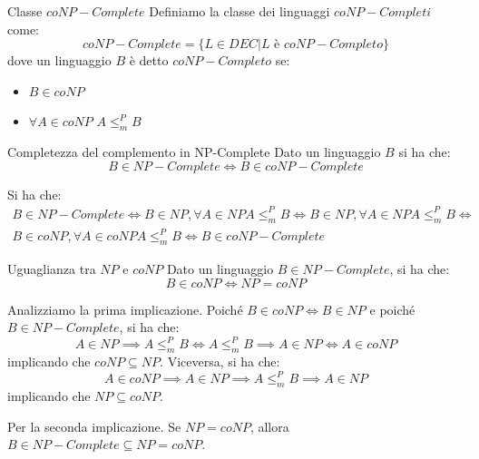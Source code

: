 \begin{Definition}{Classe $coNP-Complete$}{}
Definiamo la classe dei linguaggi $coNP-Completi$ come:
\begin{equation*}
    coNP-Complete = \{L\in DEC | L\textit{ è }coNP-Completo\}
\end{equation*}
dove un linguaggio $B$ è detto $coNP-Completo$ se:
\begin{itemize}
    \item $B\in coNP$
    \item $\forall A\in coNP$ $A\leq^P_mB$
\end{itemize}
\end{Definition}

\begin{Thm}{Completezza del complemento in NP-Complete}{}\label{thm:completezza-com-np-complete}
Dato un linguaggio $B$ si ha che:
\begin{equation*}
    B\in NP-Complete\iff B\in coNP-Complete    
\end{equation*}
\begin{demonstration}
Si ha che:
\begin{align*}
    B\in NP-Complete\iff B\in NP, \forall A\in NP A\leq^P_m B\iff B\in NP, \forall A\in NP A\leq^P_m B\iff\\ B\in coNP, \forall A\in coNP A\leq^P_m B\iff B\in coNP-Complete
\end{align*}    
\end{demonstration}
\end{Thm}

\begin{Thm}{Uguaglianza tra $NP$ e $coNP$}{}\label{thm:uguaglianza-np-conp}
Dato un linguaggio $B\in NP-Complete$, si ha che:
\begin{equation*}
    B\in coNP\iff NP = coNP    
\end{equation*}
\begin{demonstration}
Analizziamo la prima implicazione. Poiché $B\in coNP\iff B\in NP$ e poiché $B\in NP-Complete$, si ha che:
\begin{equation*}
    A\in NP\implies A \leq^P_m B\iff A \leq^P_m B\implies A\in NP\iff A\in coNP    
\end{equation*}
implicando che $coNP\subseteq NP$. Viceversa, si ha che:
\begin{equation*}
    A\in coNP\implies A\in NP\implies A\leq^P_m B\implies A\in NP    
\end{equation*}
implicando che $NP\subseteq coNP$.

Per la seconda implicazione. Se $NP = coNP$, allora $B\in NP-Complete\subseteq NP = coNP$.
\end{demonstration}
\end{Thm}


